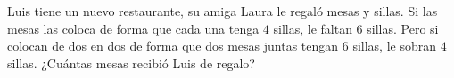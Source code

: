 Luis tiene un nuevo restaurante, su amiga Laura le regaló mesas y sillas. Si las mesas las coloca de forma que cada una tenga $4$ sillas, le faltan $6$ sillas. Pero si colocan de dos en dos de forma que dos mesas juntas tengan $6$ sillas, le sobran $4$ sillas. ¿Cuántas mesas recibió Luis de regalo?